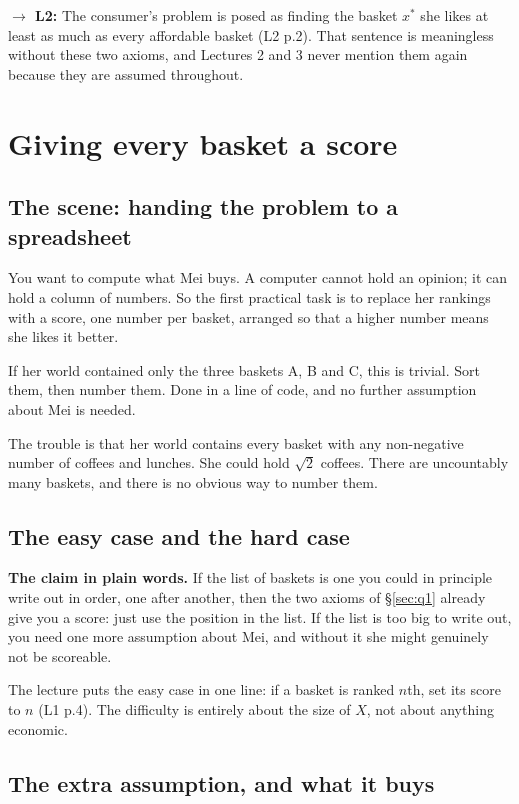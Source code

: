 \documentclass[11pt,letterpaper]{article}
\theoremstyle{definition}
\theoremstyle{plain}
\newcommand{\src}[1]{{\small\textsf{(#1)}}}
\newcommand{\fwd}[1]{\textsf{\textbf{$\rightarrow$ #1:}}}
\begin{document}
\fwd{L2} The consumer's problem is posed as finding the basket $x^*$ she likes at least as much as
every affordable basket \src{L2 p.2}. That sentence is meaningless without these two axioms, and
Lectures 2 and 3 never mention them again because they are assumed throughout.

\section{Giving every basket a score}
\label{sec:q2}

\subsection{The scene: handing the problem to a spreadsheet}

You want to compute what Mei buys. A computer cannot hold an opinion; it can hold a column of
numbers. So the first practical task is to replace her rankings with a score, one number per basket,
arranged so that a higher number means she likes it better.

If her world contained only the three baskets A, B and C, this is trivial. Sort them, then number
them. Done in a line of code, and no further assumption about Mei is needed.

The trouble is that her world contains every basket with any non-negative number of coffees and
lunches. She could hold $\sqrt{2}$ coffees. There are uncountably many baskets, and there is no
obvious way to number them.

\subsection{The easy case and the hard case}

\textbf{The claim in plain words.} If the list of baskets is one you could in principle write out in
order, one after another, then the two axioms of \S\ref{sec:q1} already give you a score: just use
the position in the list. If the list is too big to write out, you need one more assumption about
Mei, and without it she might genuinely not be scoreable.

The lecture puts the easy case in one line: if a basket is ranked $n$th, set its score to $n$
\src{L1 p.4}. The difficulty is entirely about the size of $X$, not about anything economic.

\subsection{The extra assumption, and what it buys}
\end{document}
